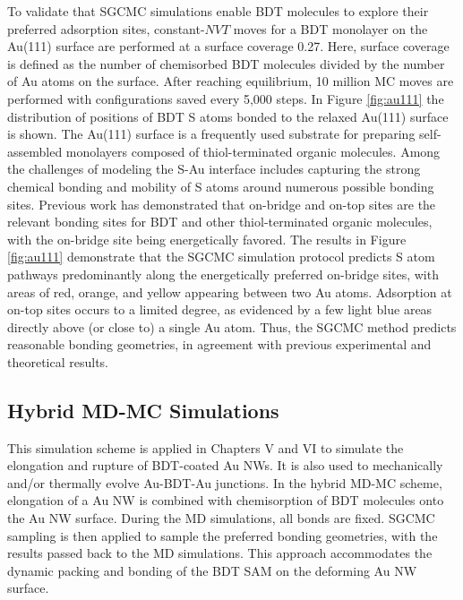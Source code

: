 \documentclass[10pt]{report}  %
\newcommand\findent{\hspace*{\parindent}}
\begin{document}
To validate that SGCMC simulations enable BDT molecules to explore their preferred adsorption sites, constant-$NVT$ moves for a BDT monolayer on the Au(111) surface are performed at a surface coverage 0.27. Here, surface coverage is defined as the number of chemisorbed BDT molecules divided by the number of Au atoms on the surface.  After reaching equilibrium, 10 million MC moves are performed with configurations saved every 5,000 steps.  In Figure \ref{fig:au111} the distribution of positions of BDT S atoms bonded to the relaxed Au(111) surface is shown.  The Au(111) surface is a frequently used substrate for preparing self-assembled monolayers composed of thiol-terminated organic molecules.\cite{Wan:2000,Cossaro:2008,Fischer:2003,Pontes:2006}  Among the challenges of modeling the S-Au interface includes capturing the strong chemical bonding and mobility of S atoms around numerous possible bonding sites.  Previous work has demonstrated that on-bridge and on-top sites are the relevant bonding sites for BDT and other thiol-terminated organic molecules, \cite{Wan:2000,Cossaro:2008,Fischer:2003,Pontes:2006,Leng:2007} with the on-bridge site being energetically favored. \cite{Cossaro:2008,Fischer:2003,Pontes:2006,Leng:2007}  The results in Figure \ref{fig:au111} demonstrate that the SGCMC simulation protocol predicts S atom pathways predominantly along the energetically preferred on-bridge sites, with areas of red, orange, and yellow appearing between two Au atoms.  Adsorption at on-top sites occurs to a limited degree, as evidenced by a few light blue areas directly above (or close to) a single Au atom.  Thus, the SGCMC method predicts reasonable bonding geometries, in agreement with previous experimental and theoretical results.

\subsection{Hybrid MD-MC Simulations}

\findent This simulation scheme is applied in Chapters V and VI to simulate the elongation and rupture of BDT-coated Au NWs. It is also used to mechanically and/or thermally evolve Au-BDT-Au junctions. In the hybrid MD-MC scheme, elongation of a Au NW is combined with chemisorption of BDT molecules onto the Au NW surface. During the MD simulations, all bonds are fixed. SGCMC sampling is then applied to sample the preferred bonding geometries, with the results passed back to the MD simulations. This approach accommodates the dynamic packing and bonding of the BDT SAM on the deforming Au NW surface. 
\end{document}

